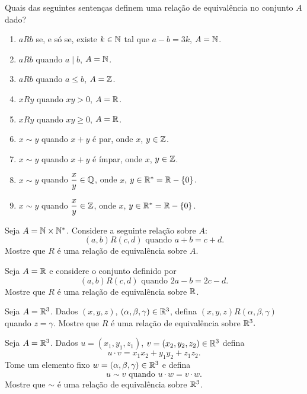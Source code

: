 \documentclass[12pt]{exam}
\begin{document}
\questao Quais das seguintes senten{\c c}as definem uma rela{\c c}{\~a}o de equival{\^e}ncia no conjunto $A$ dado?
\begin{enumerate}[label={\alph*})]
\item $aRb$ se, e s{\'o} se, existe $k \in \mathbb{N}$ tal que $a - b = 3k$, $A = \mathbb{N}$.
\item $aRb$ quando $a \mid b$, $A = \mathbb{N}$.
\item $aRb$ quando $a \le b$, $A = \mathbb{Z}$.
\item $xRy$ quando $xy > 0$, $ A = \mathbb{R}$.
\item $xRy$ quando $xy \ge 0$, $ A = \mathbb{R}$.
\item $x \sim y$ quando $x + y$ é par, onde $x$, $y \in \mathbb{Z}$.
\item $x \sim y$ quando $x + y$ é ímpar, onde $x$, $y \in \mathbb{Z}$.
\item $x \sim y$ quando $\dfrac{x}{y} \in \mathbb{Q}$, onde $x$, $y \in \mathbb{R}^* = \mathbb{R} - \{0\}$.
\item $x \sim y$ quando $\dfrac{x}{y} \in \mathbb{Z}$, onde $x$, $y \in \mathbb{R}^* = \mathbb{R} - \{0\}$.

\end{enumerate}

\vspace{.3cm}


\questao Seja $A=\mathbb{N}\times \mathbb{N}^*$. Considere a seguinte
rela{\c c}{\~a}o sobre $A$:
\[
(a,b)R (c,d) \mbox{ quando } a + b = c + d.
\]
Mostre que $R$ {\'e} uma rela{\c c}{\~a}o de equival{\^e}ncia sobre $A$.

\vspace{.3cm}

\questao Seja $A = \mathbb{R}$ e considere o conjunto definido por
\[
  (a,b)R(c,d) \mbox{ quando } 2a - b = 2c - d.
\]
Mostre que $R$ \'e uma rela\c{c}\~ao de equival\^encia sobre $\mathbb{R}$.

\vspace{.3cm}

\questao Seja $A = \mathbb{R}^3$. Dados $(x, y, z)$, $(\alpha, \beta, \gamma) \in \mathbb{R}^3$, defina $(x, y, z) R (\alpha, \beta, \gamma)$ quando $z = \gamma$. Mostre que $R$ é uma relação de equivalência sobre $\mathbb{R}^3.$

\vspace{.3cm}

\questao Seja $A = \mathbb{R}^3$. Dados $u = (x_1, y_1, z_1)$, $v = (x_2, y_2, z_2) \in \mathbb{R}^3$ defina
\[
    u\cdot v = x_1x_2 + y_1y_2 + z_1z_2.
\]
Tome um elemento fixo $w = (\alpha, \beta, \gamma) \in \mathbb{R}^3$ e defina
\[
    u \sim v \mbox{ quando } u \cdot w = v \cdot w.
\]
Mostre que $\sim$ é uma relação de equivalência sobre $\mathbb{R}^3$.
\end{document}
